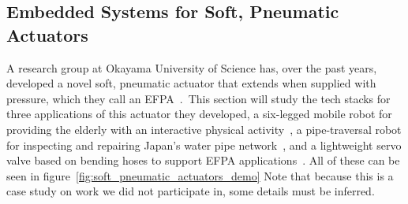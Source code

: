 \documentclass[english,12pt,a4paper,pdftex,eng,utf8]{aaltothesis}
\begin{document}
\subsection{Embedded Systems for Soft, Pneumatic Actuators}

A research group at Okayama University of Science has, over the past years, developed a novel soft, pneumatic actuator that extends when supplied with pressure, which they call an EFPA~\cite{Noritsugu2005}.\ This section will study the tech stacks for three applications of this actuator they developed, a six-legged mobile robot for providing the elderly with an interactive physical activity~\cite{Hase2020}, a pipe-traversal robot for inspecting and repairing Japan's water pipe network~\cite{Shinohara2020}, and a lightweight servo valve based on bending hoses to support EFPA applications~\cite{Kobayashi2020}.  All of these can be seen in figure~\ref{fig:soft_pneumatic_actuators_demo}  Note that because this is a case study on work we did not participate in, some details must be inferred.
\end{document}
